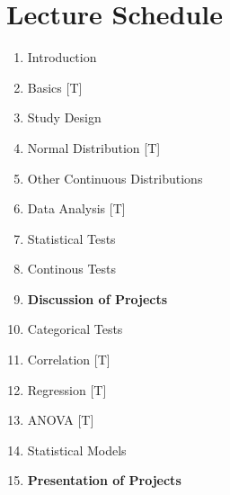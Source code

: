 \clearpage


\clearpage


\clearpage


\clearpage


\clearpage


\clearpage


\clearpage


\clearpage


\clearpage


\clearpage


\clearpage


\clearpage


\clearpage

\section{Lecture Schedule}

\begin{enumerate}
  \item Introduction
  \item Basics [T]
  \item Study Design
  \item Normal Distribution [T]
  \item Other Continuous Distributions
  \item Data Analysis [T]
  \item Statistical Tests
  \item Continous Tests
  \item \textbf{Discussion of Projects}
  \item Categorical Tests
  \item Correlation [T]
  \item Regression [T]
  \item ANOVA [T]
  \item Statistical Models
  \item \textbf{Presentation of Projects}
\end{enumerate}


